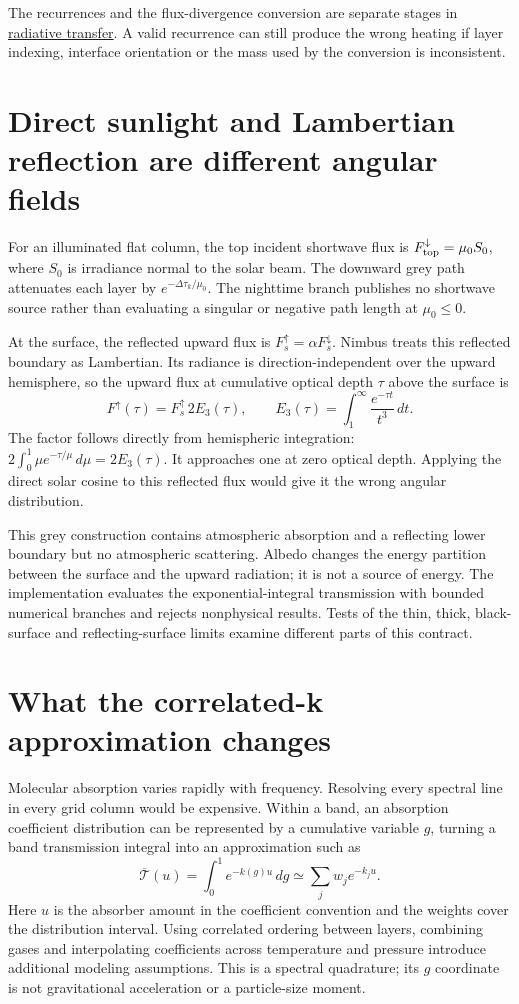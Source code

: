 The recurrences and the flux-divergence conversion are separate stages in
\href{../src/radiation/base/radiative_transfer.cpp}{radiative transfer}.
A valid recurrence can still produce the wrong heating if layer indexing,
interface orientation or the mass used by the conversion is inconsistent.

\section{Direct sunlight and Lambertian reflection are different angular fields}

For an illuminated flat column, the top incident shortwave flux is
$F^\downarrow_{\rm top}=\mu_0 S_0$, where $S_0$ is irradiance normal to the
solar beam. The downward grey path attenuates each layer by
$e^{-\Delta\tau_k/\mu_0}$. The nighttime branch publishes no shortwave source
rather than evaluating a singular or negative path length at $\mu_0\le0$.

At the surface, the reflected upward flux is
$F^\uparrow_s=\alpha F^\downarrow_s$. Nimbus treats this reflected boundary
as Lambertian. Its radiance is direction-independent over the upward hemisphere,
so the upward flux at cumulative optical depth $\tau$ above the surface is
\[
 F^\uparrow(\tau)=F^\uparrow_s\,2E_3(\tau),\qquad
 E_3(\tau)=\int_1^\infty\frac{e^{-\tau t}}{t^3}\,dt.
\]
The factor follows directly from hemispheric integration:
$2\int_0^1\mu e^{-\tau/\mu}\,d\mu=2E_3(\tau)$.
It approaches one at zero optical depth. Applying the direct solar cosine to
this reflected flux would give it the wrong angular distribution.

This grey construction contains atmospheric absorption and a reflecting lower
boundary but no atmospheric scattering. Albedo changes the energy partition
between the surface and the upward radiation; it is not a source of energy.
The implementation evaluates the exponential-integral transmission with bounded
numerical branches and rejects nonphysical results. Tests of the thin, thick,
black-surface and reflecting-surface limits examine different parts of this
contract.

\section{What the correlated-k approximation changes}

Molecular absorption varies rapidly with frequency. Resolving every spectral
line in every grid column would be expensive. Within a band, an absorption
coefficient distribution can be represented by a cumulative variable $g$,
turning a band transmission integral into an approximation such as
\[
 \overline{\mathcal T}(u)
 =\int_0^1e^{-k(g)u}\,dg
 \simeq\sum_j w_j e^{-k_j u}.
\]
Here $u$ is the absorber amount in the coefficient convention and the weights
cover the distribution interval. Using correlated ordering between layers,
combining gases and interpolating coefficients across temperature and pressure
introduce additional modeling assumptions. This is a spectral quadrature;
its $g$ coordinate is not gravitational acceleration or a particle-size moment.

